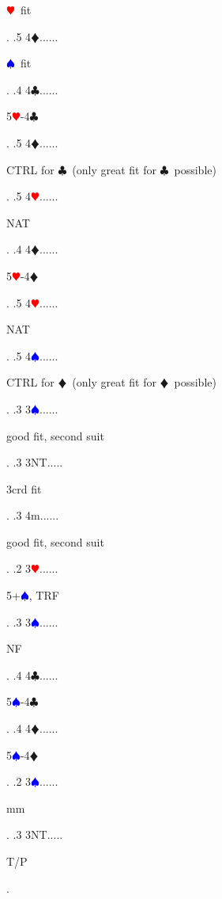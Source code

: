 \documentclass[a4paper]{article}
\newcommand{\BC}{\textcolor{OliveGreen}{$\clubsuit$}}
\newcommand{\BD}{\textcolor{RedOrange}{$\vardiamondsuit$}}
\newcommand{\BH}{\textcolor{Red}{$\varheartsuit${}}}
\newcommand{\BS}{\textcolor{Blue}{$\spadesuit${}}}
\begin{document}
{\begin{minipage}[t]{0.8\textwidth}
\BH\ fit
\end{minipage}. 
 .5 4\BD......\begin{minipage}[t]{0.8\textwidth}
\BS\ fit
\end{minipage}. 
 .4 4\BC......\begin{minipage}[t]{0.8\textwidth}
5\BH -4\BC 
\end{minipage}. 
 .5 4\BD......\begin{minipage}[t]{0.8\textwidth}
CTRL for \BC\ (only great fit for \BC\ possible)
\end{minipage}. 
 .5 4\BH......\begin{minipage}[t]{0.8\textwidth}
NAT
\end{minipage}. 
 .4 4\BD......\begin{minipage}[t]{0.8\textwidth}
5\BH -4\BD 
\end{minipage}. 
 .5 4\BH......\begin{minipage}[t]{0.8\textwidth}
NAT
\end{minipage}. 
 .5 4\BS......\begin{minipage}[t]{0.8\textwidth}
CTRL for \BD\ (only great fit for \BD\ possible)
\end{minipage}. 
 .3 3\BS......\begin{minipage}[t]{0.8\textwidth}
good fit, second suit
\end{minipage}. 
 .3 3NT.....\begin{minipage}[t]{0.8\textwidth}
3crd fit
\end{minipage}. 
 .3 4m......\begin{minipage}[t]{0.8\textwidth}
good fit, second suit
\end{minipage}. 
 .2 3\BH......\begin{minipage}[t]{0.8\textwidth}
5+\BS , TRF
\end{minipage}. 
 .3 3\BS......\begin{minipage}[t]{0.8\textwidth}
NF
\end{minipage}. 
 .4 4\BC......\begin{minipage}[t]{0.8\textwidth}
5\BS -4\BC 
\end{minipage}. 
 .4 4\BD......\begin{minipage}[t]{0.8\textwidth}
5\BS -4\BD 
\end{minipage}. 
 .2 3\BS......\begin{minipage}[t]{0.8\textwidth}
mm
\end{minipage}. 
 .3 3NT.....\begin{minipage}[t]{0.8\textwidth}
T/P
\end{minipage}. 
}
\end{document}

